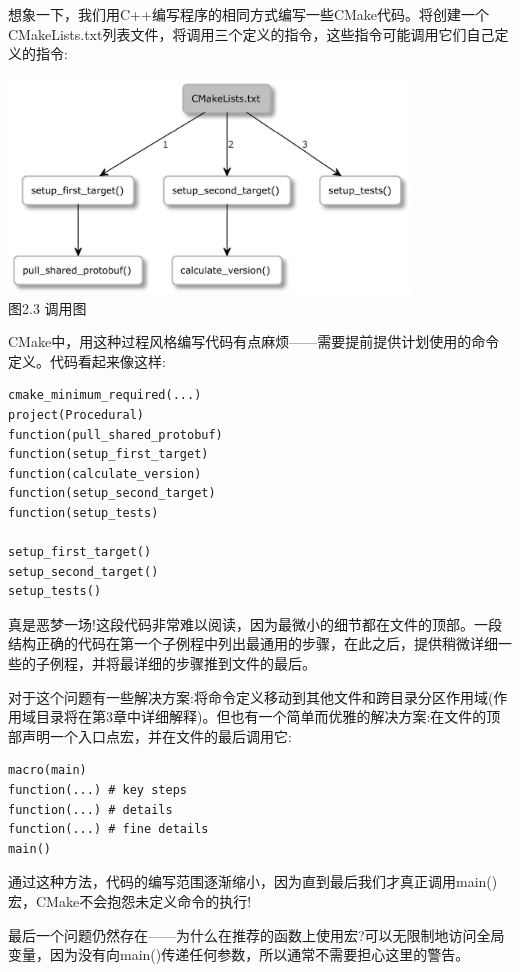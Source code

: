 想象一下，我们用C++编写程序的相同方式编写一些CMake代码。将创建一个CMakeLists.txt列表文件，将调用三个定义的指令，这些指令可能调用它们自己定义的指令:

\begin{center}
\includegraphics[width=0.8\textwidth]{content/1/chapter2/images/3.jpg}\\
图2.3 调用图
\end{center}

CMake中，用这种过程风格编写代码有点麻烦——需要提前提供计划使用的命令定义。代码看起来像这样:

\begin{lstlisting}[style=styleCMake]
cmake_minimum_required(...)
project(Procedural)
function(pull_shared_protobuf)
function(setup_first_target)
function(calculate_version)
function(setup_second_target)
function(setup_tests)

setup_first_target()
setup_second_target()
setup_tests()
\end{lstlisting}

真是恶梦一场!这段代码非常难以阅读，因为最微小的细节都在文件的顶部。一段结构正确的代码在第一个子例程中列出最通用的步骤，在此之后，提供稍微详细一些的子例程，并将最详细的步骤推到文件的最后。

对于这个问题有一些解决方案:将命令定义移动到其他文件和跨目录分区作用域(作用域目录将在第3章中详细解释)。但也有一个简单而优雅的解决方案:在文件的顶部声明一个入口点宏，并在文件的最后调用它:

\begin{lstlisting}[style=styleCMake]
macro(main)
function(...) # key steps
function(...) # details
function(...) # fine details
main()
\end{lstlisting}

通过这种方法，代码的编写范围逐渐缩小，因为直到最后我们才真正调用main()宏，CMake不会抱怨未定义命令的执行!

最后一个问题仍然存在——为什么在推荐的函数上使用宏?可以无限制地访问全局变量，因为没有向main()传递任何参数，所以通常不需要担心这里的警告。

